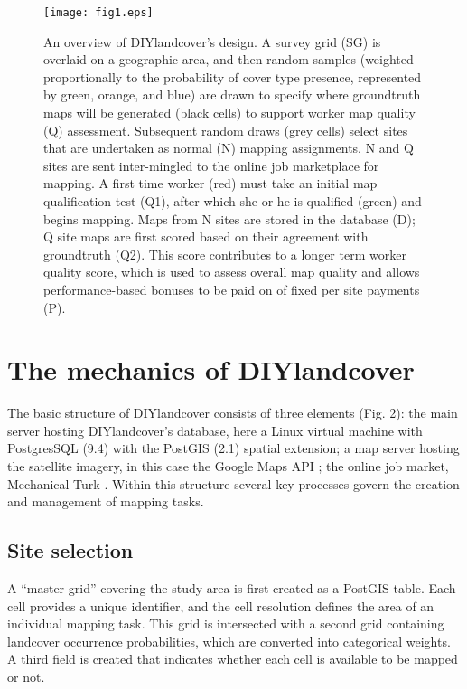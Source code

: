 \documentclass[preprint,12pt,authoryear]{elsarticle}
\begin{document}
\begin{figure}[!ht]
  \begin{center}
    \texttt{[image: fig1.eps]}
    \caption{An overview of DIYlandcover's design. A survey grid (SG) is overlaid on a geographic area, and then random samples (weighted proportionally to the probability of cover type presence, represented by green, orange, and blue) are drawn to specify where groundtruth maps will be generated (black cells) to support worker map quality (Q) assessment. Subsequent random draws (grey cells) select sites that are undertaken as normal (N) mapping assignments. N and Q sites are sent inter-mingled to the online job marketplace for mapping. A first time worker (red) must take an initial map qualification test (Q1), after which she or he is qualified (green) and begins mapping. Maps from N sites are stored in the database (D); Q site maps are first scored based on their agreement with groundtruth (Q2). This score contributes to a longer term worker quality score, which is used to assess overall map quality and allows performance-based bonuses to be paid on of fixed per site payments (P).}
    \label{default}
  \end{center}
\end{figure}

\section{The mechanics of DIYlandcover}
The basic structure of DIYlandcover consists of three elements (Fig. 2): the main server hosting DIYlandcover's  database, here a Linux virtual machine with PostgresSQL (9.4) with the PostGIS (2.1) spatial extension;  a map server hosting the satellite imagery, in this case the Google Maps API \citep{google_developers_google_2012}; the online job market, Mechanical Turk \citep{amazon_web_services_amazon_2012}. Within this structure several key processes govern the creation and management of mapping tasks.  

\subsection{Site selection}
A ``master grid'' covering the study area is first created as a PostGIS table. Each cell provides a unique identifier, and the cell resolution defines the area of an individual mapping task. This grid is intersected with a second grid containing landcover occurrence probabilities, which are converted into categorical weights. A third field is created that indicates whether each cell is available to be mapped or not.  
\end{document}
